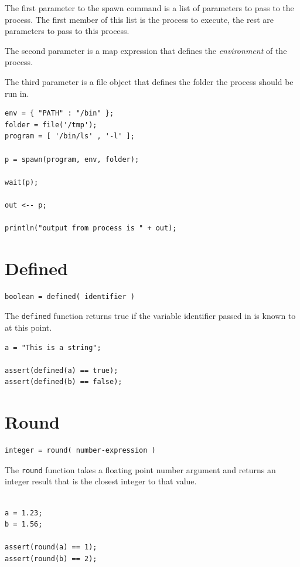 The first parameter to the spawn command is a list of parameters to pass to the process. The first member of this list is the process to execute, the rest are parameters to pass to this process.

The second parameter is a map expression that defines the \emph{environment} of the process. 

The third parameter is a file object that defines the folder the process should be run in.

\begin{lstlisting}[caption={Spawn example}]
env = { "PATH" : "/bin" };
folder = file('/tmp');
program = [ '/bin/ls' , '-l' ];

p = spawn(program, env, folder);

wait(p);

out <-- p;

println("output from process is " + out);
\end{lstlisting}

\section{Defined}

\begin{verbatim}
boolean = defined( identifier )
\end{verbatim}

The \verb+defined+ function returns true if the variable identifier passed in is known to \Reflex at this point.

\begin{lstlisting}[caption={Defined example}]
a = "This is a string";

assert(defined(a) == true);
assert(defined(b) == false);

\end{lstlisting}

\section{Round}

\begin{verbatim}
integer = round( number-expression )
\end{verbatim}

The \verb+round+ function takes a floating point number argument and returns an integer result that is the closest integer to that value.

\begin{lstlisting}[caption={Round example}]

a = 1.23;
b = 1.56;

assert(round(a) == 1);
assert(round(b) == 2);
\end{lstlisting}

